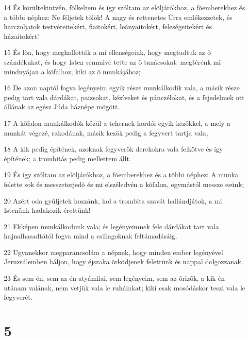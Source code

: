 \par 14 És körültekintvén, fölkeltem és így szóltam az elõljárókhoz, a fõemberekhez és a többi néphez: Ne féljetek tõlök! A nagy és rettenetes Úrra emlékezzetek, és harczoljatok testvéreitekért, fiaitokért, leányaitokért, feleségeitekért és házaitokért!
\par 15 És lõn, hogy meghallották a mi ellenségeink, hogy megtudtuk az õ szándékukat, és hogy Isten semmivé tette az õ tanácsokat: megtérénk mi mindnyájan a kõfalhoz, kiki az õ munkájához;
\par 16 De azon naptól fogva legényeim egyik része munkálkodik vala, a másik része pedig tart vala dárdákat, paizsokat, kézíveket és pánczélokat, és a fejedelmek ott állának az egész Júda háznépe mögött.
\par 17 A kõfalon munkálkodók közül a tehernek hordói egyik kezökkel, a mely a munkát végezé, rakodának, másik kezök pedig a fegyvert tartja vala,
\par 18 A kik pedig építének, azoknak fegyverök derekokra vala felkötve és így építének; a trombitás pedig mellettem állt.
\par 19 És így szóltam az elõljárókhoz, a fõemberekhez és a többi néphez: A munka felette sok és messzeterjedõ és mi elszéledvén a kõfalon, egymástól messze esünk;
\par 20 Azért oda gyûljetek hozzánk, hol a trombita szavát hallándjátok, a mi Istenünk hadakozik érettünk!
\par 21 Ekképen munkálkodunk vala; és legényeimnek fele dárdákat tart vala hajnalhasadtától fogva mind a csillagoknak feltámadásáig.
\par 22 Ugyanekkor megparancsolám a népnek, hogy minden ember legényével Jeruzsálemben háljon, hogy éjszaka õrködjenek felettünk és nappal dolgozzanak.
\par 23 És sem én, sem az én atyámfiai, sem legényeim, sem az õrizõk, a kik én utánam valának, nem vetjük vala le ruháinkat; kiki csak mosódáskor teszi vala le fegyverét.

\chapter{5}

